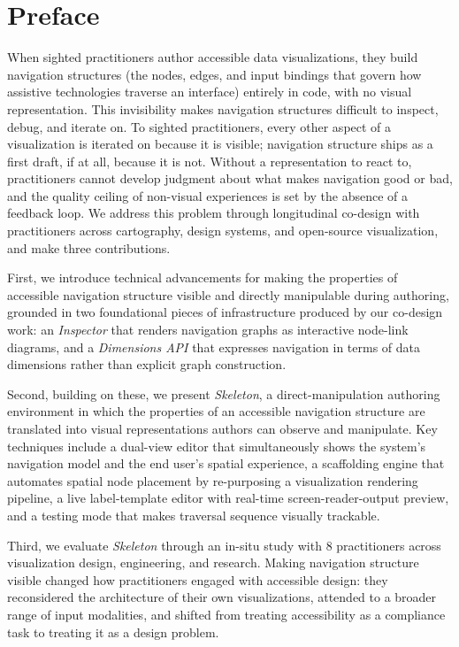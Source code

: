 \documentclass[12pt]{cmuthesis}
\begin{document}
\section{Preface}

When sighted practitioners author accessible data visualizations, they build navigation structures (the nodes, edges, and input bindings that govern how assistive technologies traverse an interface) entirely in code, with no visual representation. This invisibility makes navigation structures difficult to inspect, debug, and iterate on. To sighted practitioners, every other aspect of a visualization is iterated on because it is visible; navigation structure ships as a first draft, if at all, because it is not. Without a representation to react to, practitioners cannot develop judgment about what makes navigation good or bad, and the quality ceiling of non-visual experiences is set by the absence of a feedback loop. We address this problem through longitudinal co-design with practitioners across cartography, design systems, and open-source visualization, and make three contributions.

First, we introduce technical advancements for making the properties of accessible navigation structure visible and directly manipulable during authoring, grounded in two foundational pieces of infrastructure produced by our co-design work: an \textit{Inspector} that renders navigation graphs as interactive node-link diagrams, and a \textit{Dimensions API} that expresses navigation in terms of data dimensions rather than explicit graph construction.

Second, building on these, we present \textit{Skeleton}, a direct-manipulation authoring environment in which the properties of an accessible navigation structure are translated into visual representations authors can observe and manipulate. Key techniques include a dual-view editor that simultaneously shows the system's navigation model and the end user's spatial experience, a scaffolding engine that automates spatial node placement by re-purposing a visualization rendering pipeline, a live label-template editor with real-time screen-reader-output preview, and a testing mode that makes traversal sequence visually trackable.

Third, we evaluate \textit{Skeleton} through an in-situ study with 8 practitioners across visualization design, engineering, and research. Making navigation structure visible changed how practitioners engaged with accessible design: they reconsidered the architecture of their own visualizations, attended to a broader range of input modalities, and shifted from treating accessibility as a compliance task to treating it as a design problem.
\end{document}
